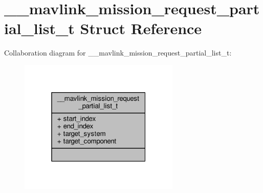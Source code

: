 \hypertarget{struct____mavlink__mission__request__partial__list__t}{\section{\+\_\+\+\_\+mavlink\+\_\+mission\+\_\+request\+\_\+partial\+\_\+list\+\_\+t Struct Reference}
\label{struct____mavlink__mission__request__partial__list__t}
}


Collaboration diagram for \+\_\+\+\_\+mavlink\+\_\+mission\+\_\+request\+\_\+partial\+\_\+list\+\_\+t\+:
\nopagebreak
\begin{figure}[H]
\begin{center}
\leavevmode
\includegraphics[width=217pt]{struct____mavlink__mission__request__partial__list__t__coll__graph}
\end{center}
\end{figure}
